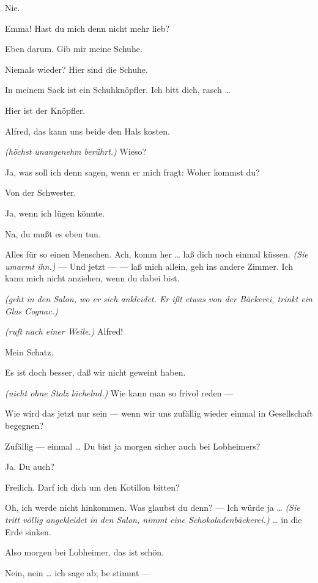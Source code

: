 \documentclass[
	final,
	a4paper,
	ngerman,
	mpinclude = true, %
	twoside = true,
	open = right,
	cleardoublepage = plain,
	DIV = 13,
	BCOR = 1cm,
	titlepage = firstiscover,
	]{scrbook}
\newcommand{\direction}[1]{\textit{(#1)}}
\newcommand{\thecharacter}[1]{\textup{\textsc{#1}}\xspace}
\newcommand{\theherr}{\thecharacter{Junger Herr}}
\newcommand{\thefrau}{\thecharacter{Junge Frau}}
\newcommand{\character}[1]{\item[#1:]}
\newcommand{\herr}{\character{\theherr}}
\newcommand{\frau}{\character{\thefrau}}
\begin{document}
\begin{play}
	\frau
	Nie.

	\herr
	Emma! Hast du mich denn nicht mehr lieb?

	\frau
	Eben darum. Gib mir meine Schuhe.

	\herr
	Niemals wieder? Hier sind die Schuhe.

	\frau
	In meinem Sack ist ein Schuhknöpfler. Ich bitt dich, rasch \ldots{}

	\herr
	Hier ist der Knöpfler.

	\frau
	Alfred, das kann uns beide den Hals kosten.

	\herr
	\direction{höchst unangenehm berührt.} Wieso?

	\frau
	Ja, was soll ich denn sagen, wenn er mich fragt: Woher kommst du?

	\herr
	Von der Schwester.

	\frau
	Ja, wenn ich lügen könnte.

	\herr
	Na, du mußt es eben tun.

	\frau
	Alles für so einen Menschen. Ach, komm her \ldots{} laß dich noch einmal küssen. \direction{Sie umarmt ihn.} --- Und jetzt --- --- laß mich allein, geh ins andere Zimmer. Ich kann mich nicht anziehen, wenn du dabei bist.

	\herr
	\direction{geht in den Salon, wo er sich ankleidet. Er ißt etwas von der Bäckerei, trinkt ein Glas Cognac.}

	\frau
	\direction{ruft nach einer Weile.} Alfred!

	\herr
	Mein Schatz.

	\frau
	Es ist doch besser, daß wir nicht geweint haben.

	\herr
	\direction{nicht ohne Stolz lächelnd.} Wie kann man so frivol reden ---

	\frau
	Wie wird das jetzt nur sein --- wenn wir uns zufällig wieder einmal in Gesellschaft begegnen?

	\herr
	Zufällig --- einmal \ldots{} Du bist ja morgen sicher auch bei Lobheimers?

	\frau
	Ja. Du auch?

	\herr
	Freilich. Darf ich dich um den Kotillon bitten?

	\frau
	Oh, ich werde nicht hinkommen. Was glaubst du denn? --- Ich würde ja \ldots{} \direction{Sie tritt völlig angekleidet in den Salon, nimmt eine Schokoladenbäckerei.} \ldots{} in die Erde sinken.

	\herr
	Also morgen bei Lobheimer, das ist schön.

	\frau
	Nein, nein \ldots{} ich sage ab; be stimmt ---


\end{play}
\end{document}
